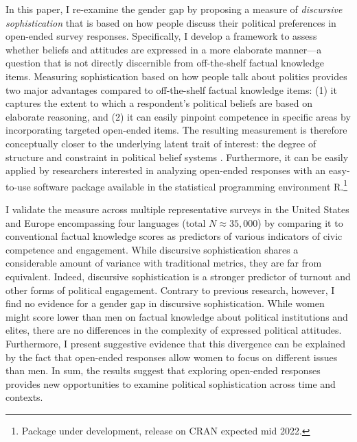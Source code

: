 In this paper, I re-examine the gender gap by proposing a measure of \textit{discursive sophistication} that is based on how people discuss their political preferences in open-ended survey responses. Specifically, I develop a framework to assess whether beliefs and attitudes are expressed in a more elaborate manner---a question that is not directly discernible from off-the-shelf factual knowledge items. %
Measuring sophistication based on how people talk about politics provides two major advantages compared to off-the-shelf factual knowledge items: (1) it captures the extent to which a respondent's political beliefs are based on elaborate reasoning, and (2) it can easily pinpoint competence in specific areas by incorporating targeted open-ended items. The resulting measurement is therefore conceptually closer to the underlying latent trait of interest: the degree of structure and constraint in political belief systems \citep{tetlock1983cognitive,luskin1987measuring}. Furthermore, it can be easily applied by researchers interested in analyzing open-ended responses with an easy-to-use software package available in the statistical programming environment R.\footnote{Package under development, release on CRAN expected mid 2022.}

I validate the measure across multiple representative surveys in the United States and Europe encompassing four languages (total $N \approx 35,000$) by comparing it to conventional factual knowledge scores as predictors of various indicators of civic competence and engagement. While discursive sophistication shares a considerable amount of variance with traditional metrics, they are far from equivalent. Indeed, discursive sophistication is a stronger predictor of turnout and other forms of political engagement. Contrary to previous research, however, I find no evidence for a gender gap in discursive sophistication. While women might score lower than men on factual knowledge about political institutions and elites, there are no differences in the complexity of expressed political attitudes. Furthermore, I present suggestive evidence that this divergence can be explained by the fact that open-ended responses allow women to focus on different issues than men. In sum, the results suggest that exploring open-ended responses provides new opportunities to examine political sophistication across time and contexts.


